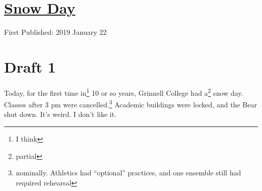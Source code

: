 \documentclass[12pt]{article}[titlepage]
\newcommand{\say}[1]{``#1''}
\newcommand{\1}{\={a}}
\newcommand{\2}{\={e}}
\newcommand{\3}{\={\i}}
\newcommand{\4}{\=o}
\newcommand{\5}{\=u}
\newcommand{\6}{\={A}}
\renewcommand{\,}{\textsuperscript{,}}
\begin{document}
\doublespacing
\section{\href{snow-day.html}{Snow Day}}
First Published: 2019 January 22
\section{Draft 1}
Today, for the first time in\footnote{I think} 10 or so years, Grinnell College had a\footnote{partial} snow day.
Classes after 3 pm were cancelled.\footnote{nominally. Athletics had \say{optional} practices, and one ensemble still had required rehearsal}
Academic buildings were locked, and the Bear shut down.
It's weird.
I don't like it.
\end{document}
